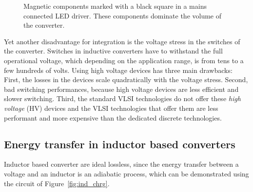 \begin{figure}
\centering
{}
\caption{Magnetic components marked with a black square in a mains connected LED driver. These components dominate the volume of the converter.}
\label{fig:smps_driver}
\end{figure}

Yet another disadvantage for integration is the voltage stress in the switches of the converter. Switches in inductive converters have to withstand the full operational voltage, which depending on the application range, is from tens to a few hundreds of volts. Using high voltage devices has three main drawbacks: First, the losses in the devices scale quadratically with the voltage  stress. Second, bad switching performances, because high voltage devices are less efficient and slower switching. Third, the standard VLSI technologies do not offer these \emph{high voltage} (HV) devices and the VLSI technologies that offer them are less performant and more expensive than the dedicated discrete technologies.

\subsection{Energy transfer in inductor based converters}
Inductor based converter are ideal lossless, since the energy transfer between a voltage and an inductor is an adiabatic process, which can be demonstrated using the circuit of Figure~\ref{fig:ind_chrg}.

